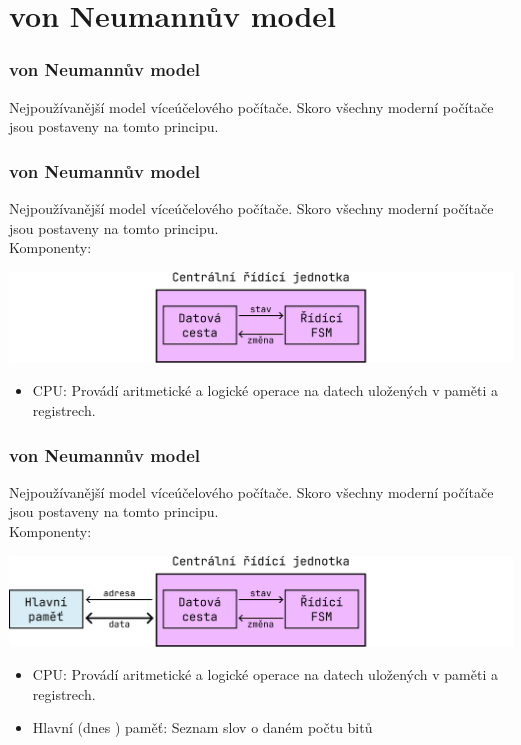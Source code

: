 \documentclass[aspectratio=169,11pt,svgnames]{beamer}
\begin{document}
\section{von Neumannův model}

\begin{frame}
 \frametitle{von Neumannův model}
 Nejpoužívanější model víceúčelového počítače. Skoro všechny moderní počítače
 jsou postaveny na tomto principu.
\end{frame}

\begin{frame}
 \frametitle{von Neumannův model}
 Nejpoužívanější model víceúčelového počítače. Skoro všechny moderní počítače
 jsou postaveny na tomto principu.\\
 Komponenty:
 \vspace*{-1em}
 \begin{center}
  \includegraphics[width=.75\textwidth]{von-neumann-1.pdf}
 \end{center}
 \begin{itemize}[label=\textbullet]
  \item \alert{CPU}: Provádí aritmetické a logické operace na datech uložených v
   paměti a registrech.
 \end{itemize}
\end{frame}

\begin{frame}
 \frametitle{von Neumannův model}
 Nejpoužívanější model víceúčelového počítače. Skoro všechny moderní počítače
 jsou postaveny na tomto principu.\\
 Komponenty:
 \vspace*{-1em}
 \begin{center}
  \includegraphics[width=.75\textwidth]{von-neumann-2.pdf}
 \end{center}
 \begin{itemize}[label=\textbullet]
  \item \alert{CPU}: Provádí aritmetické a logické operace na datech uložených v
   paměti a registrech.
  \item \alert{Hlavní (dnes ) paměť}: Seznam \alert{slov} o daném
   počtu \alert{bitů} 
 \end{itemize}
\end{frame}
\end{document}
